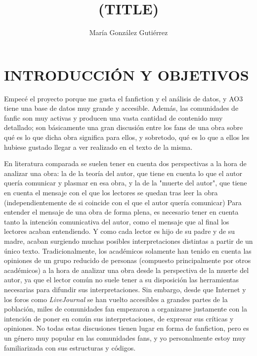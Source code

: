 \documentclass{pre-tfg}
\title{(TITLE)}
\author{María González Gutiérrez}
\begin{document}
\maketitle
\tableofcontents

\newpage


\section{INTRODUCCIÓN Y OBJETIVOS}

Empecé el proyecto porque me gusta el fanfiction y el análisis de datos, y AO3 tiene una base de datos muy grande  y accesible. Además, las comunidades de fanfic son muy activas y producen una vasta cantidad de contenido muy detallado; son básicamente una gran discusión entre los fans de una obra sobre qué es lo que dicha obra significa para ellos, y sobretodo, qué es lo que a ellos les hubiese gustado llegar a ver realizado en el texto de la misma.

En literatura comparada se suelen tener en cuenta dos perspectivas a la hora de analizar una obra: la de la teoría del autor, que tiene en cuenta lo que el autor quería comunicar y plasmar en esa obra, y la de la "muerte del autor"\cite{Barthes}, que tiene en cuenta el mensaje con el que los lectores se quedan tras leer la obra (independientemente de si coincide con el que el autor quería comunicar)
Para entender el mensaje de una obra de forma plena, es necesario tener en cuenta tanto la intención comunicativa del autor, como el mensaje que al final los lectores acaban entendiendo. Y como cada lector es hijo de su padre y de su madre, acaban surgiendo muchas posibles interpretaciones distintas a partir de un único texto.
Tradicionalmente, los académicos solamente han tenido en cuenta las opiniones de un grupo reducido de personas (compuesto principalmente por otros académicos) a la hora de analizar una obra desde la perspectiva de la muerte del autor, ya que el lector común no suele tener a su disposición las herramientas necesarias para difundir sus interpretaciones. Sin embargo, desde que Internet y los foros como \textit{LiveJournal} se han vuelto accesibles a grandes partes de la población, miles de comunidades fan empezaron a organizarse justamente con la intención de poner en común sus interpretaciones, de expresar sus críticas y opiniones. No todas estas discusiones tienen lugar en forma de fanfiction, pero es un género muy popular en las comunidades fans, y yo personalmente estoy muy familiarizada con sus estructuras y códigos.
\end{document}
